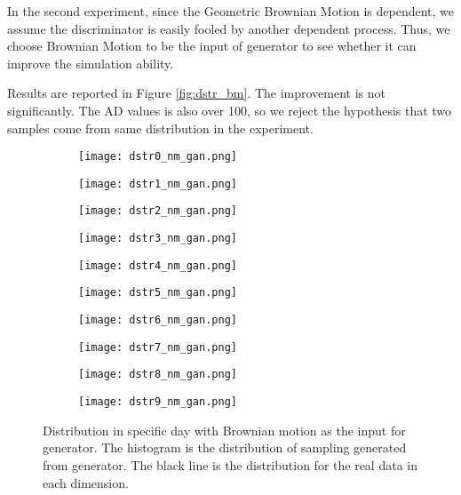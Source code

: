 \documentclass{article}
\begin{document}
	In the second experiment, 
	since the Geometric Brownian Motion is dependent, we assume the discriminator is easily fooled by another dependent process.
	Thus, we choose Brownian Motion to be the input of generator to see whether it can improve the simulation ability.

	Results are reported in Figure \ref{fig:dstr_bm}. 
	The improvement is not significantly.
	The AD values is also over 100, so we reject the hypothesis that two samples come from same distribution in the experiment. 
	
	\begin{figure}
		\begin{subfigure}[b]{0.3\textwidth}
			\texttt{[image: dstr0\_nm\_gan.png]}
		\end{subfigure}
		\hfill
		\begin{subfigure}[b]{0.3\textwidth}
			\texttt{[image: dstr1\_nm\_gan.png]}
			
		\end{subfigure}
		\hfill
		\begin{subfigure}[b]{0.3\textwidth}
			\texttt{[image: dstr2\_nm\_gan.png]}
		\end{subfigure}
		
		\begin{subfigure}[b]{0.3\textwidth}
			\texttt{[image: dstr3\_nm\_gan.png]}
			
		\end{subfigure}
		\hfill
		\begin{subfigure}[b]{0.3\textwidth}
			\texttt{[image: dstr4\_nm\_gan.png]}
		\end{subfigure}
		\hfill
		\begin{subfigure}[b]{0.3\textwidth}
			\texttt{[image: dstr5\_nm\_gan.png]}
		\end{subfigure}
		
		\begin{subfigure}[b]{0.3\textwidth}
			\texttt{[image: dstr6\_nm\_gan.png]}
		\end{subfigure}
		\hfill
		\begin{subfigure}[b]{0.3\textwidth}
			\texttt{[image: dstr7\_nm\_gan.png]}
		\end{subfigure}
		\hfill
		\begin{subfigure}[b]{0.3\textwidth}
			\texttt{[image: dstr8\_nm\_gan.png]}
		\end{subfigure}
		\begin{subfigure}[b]{0.3\textwidth}
			\texttt{[image: dstr9\_nm\_gan.png]}
		\end{subfigure}
		\caption{Distribution in specific day with Brownian motion as the input for generator. The histogram is the distribution of sampling generated from generator. The black line is the distribution for the real data in each dimension.}
		\label{fig:dstr_nm}
	\end{figure}
\end{document}
